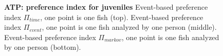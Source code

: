 \begin{appendices}
\begin{figure}[h]
      \caption{\textbf{ATP: preference index for juveniles} Event-based preference index $\Pi_{time}$, one point is one fish (top). Event-based preference index $\Pi_{event}$, one point is one fish analyzed by one person (middle). Event-based preference index $\Pi_{markov}$, one point is one fish analyzed by one person (bottom).}
      \label{dist_atp}
    \end{figure}

\end{appendices}
